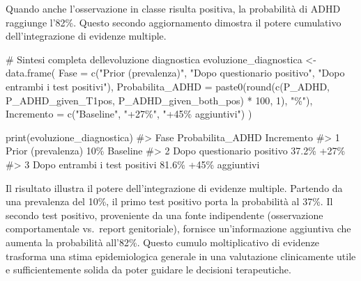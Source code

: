 \documentclass[
  letterpaper,
  DIV=11,
  numbers=noendperiod,
  oneside]{scrreprt}
\newenvironment{Shaded}{\begin{snugshade}}{\end{snugshade}}
\newcommand{\AttributeTok}[1]{\textcolor[rgb]{0.40,0.45,0.13}{#1}}
\newcommand{\CommentTok}[1]{\textcolor[rgb]{0.37,0.37,0.37}{#1}}
\newcommand{\DecValTok}[1]{\textcolor[rgb]{0.68,0.00,0.00}{#1}}
\newcommand{\FunctionTok}[1]{\textcolor[rgb]{0.28,0.35,0.67}{#1}}
\newcommand{\NormalTok}[1]{\textcolor[rgb]{0.00,0.23,0.31}{#1}}
\newcommand{\OtherTok}[1]{\textcolor[rgb]{0.00,0.23,0.31}{#1}}
\newcommand{\SpecialCharTok}[1]{\textcolor[rgb]{0.37,0.37,0.37}{#1}}
\newcommand{\StringTok}[1]{\textcolor[rgb]{0.13,0.47,0.30}{#1}}
\theoremstyle{definition}
\theoremstyle{plain}
\theoremstyle{definition}
\theoremstyle{remark}
\begin{document}
\begin{tcolorbox}
Quando anche l'osservazione in classe risulta positiva, la probabilità
di ADHD raggiunge l'82\%. Questo secondo aggiornamento dimostra il
potere cumulativo dell'integrazione di evidenze multiple.

\begin{Shaded}
\begin{Highlighting}[]
\CommentTok{\# Sintesi completa dell\textquotesingle{}evoluzione diagnostica}
\NormalTok{evoluzione\_diagnostica }\OtherTok{\textless{}{-}} \FunctionTok{data.frame}\NormalTok{(}
  \AttributeTok{Fase =} \FunctionTok{c}\NormalTok{(}\StringTok{"Prior (prevalenza)"}\NormalTok{, }\StringTok{"Dopo questionario positivo"}\NormalTok{, }\StringTok{"Dopo entrambi i test positivi"}\NormalTok{),}
  \AttributeTok{Probabilita\_ADHD =} \FunctionTok{paste0}\NormalTok{(}\FunctionTok{round}\NormalTok{(}\FunctionTok{c}\NormalTok{(P\_ADHD, P\_ADHD\_given\_T1pos, P\_ADHD\_given\_both\_pos) }\SpecialCharTok{*} \DecValTok{100}\NormalTok{, }\DecValTok{1}\NormalTok{), }\StringTok{"\%"}\NormalTok{),}
  \AttributeTok{Incremento =} \FunctionTok{c}\NormalTok{(}\StringTok{"Baseline"}\NormalTok{, }\StringTok{"+27\%"}\NormalTok{, }\StringTok{"+45\% aggiuntivi"}\NormalTok{)}
\NormalTok{)}

\FunctionTok{print}\NormalTok{(evoluzione\_diagnostica)}
\CommentTok{\#\textgreater{}                            Fase Probabilita\_ADHD      Incremento}
\CommentTok{\#\textgreater{} 1            Prior (prevalenza)              10\%        Baseline}
\CommentTok{\#\textgreater{} 2    Dopo questionario positivo            37.2\%            +27\%}
\CommentTok{\#\textgreater{} 3 Dopo entrambi i test positivi            81.6\% +45\% aggiuntivi}
\end{Highlighting}
\end{Shaded}

Il risultato illustra il potere dell'integrazione di evidenze multiple.
Partendo da una prevalenza del 10\%, il primo test positivo porta la
probabilità al 37\%. Il secondo test positivo, proveniente da una fonte
indipendente (osservazione comportamentale vs.~report genitoriale),
fornisce un'informazione aggiuntiva che aumenta la probabilità all'82\%.
Questo cumulo moltiplicativo di evidenze trasforma una stima
epidemiologica generale in una valutazione clinicamente utile e
sufficientemente solida da poter guidare le decisioni terapeutiche.

\end{tcolorbox}
\end{document}
